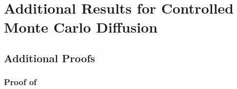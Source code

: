 
\chapter{Additional Results for Controlled Monte Carlo Diffusion}

\label{app:cmcd}
\section{Additional Proofs}

\subsection{Proof of }
\label{sec:proof-fbrnd-app}

